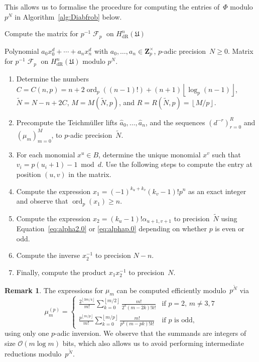 \documentclass[a4paper,11pt]{article}
\numberwithin{equation}{section}
\providecommand{\floor}[1]{\left\lfloor#1\right\rfloor}   %
\newcommand{\ZZ}{\mathbf{Z}} %
\DeclareMathOperator{\ord}{ord}          %
\DeclareMathOperator{\Frob}{\mathcal{F}} %
\providecommand{\HdR}{H_{\text{dR}}}    %
\providecommand{\BigOh}{\mathcal{O}} %
\theoremstyle{definition}
\newtheorem{rem}[thm]{Remark}
\begin{document}
This allows us to formalise the procedure for computing the 
entries of~$\Phi$ modulo~$p^N$ in Algorithm~\ref{alg:Diabfrob} 
below.

\begin{algorithm}
\caption{Compute the matrix for $p^{-1} \Frob_p$ on $\HdR^n(\mathfrak{U})$}
\label{alg:Diabfrob}
\begin{algorithmic}
\vspace{1mm}
\Require Polynomial $a_0 x_0^d + \dotsb + a_n x_n^d$ 
         with $a_0,\dotsc,a_n \in \ZZ_p^{\times}$, 
         $p$-adic precision~$N \geq 0$.
\Ensure  Matrix for $p^{-1} \Frob_p$ on $\HdR^n(\mathfrak{U})$ modulo $p^N$.
\begin{enumerate}
\item Determine the numbers 
      $C = C(n,p) = n + 2 \ord_p((n-1)!) + (n+1) \floor{\log_p(n-1)}$, 
      $\tilde{N} = N - n + 2 C$, $M = M(\tilde{N}, p)$, and 
      $R = R(\tilde{N}, p) = \floor{M/p}$.
\item Precompute the Teichm\"uller lifts $\hat{a}_0, \dotsc, \hat{a}_n$, 
      and the sequences $(d^{-r})_{r=0}^R$ and $(\mu_m)_{m=0}^{M}$, 
      to $p$-adic precision~$\tilde{N}$.
\item For each monomial $x^u \in B$, 
      determine the unique monomial $x^v$ such that 
      $v_i = p (u_i + 1) - 1 \bmod{d}$.  Use the following steps to 
      compute the entry at position $(u,v)$ in the matrix.
\item Compute the expression $x_1 = (-1)^{k_u+k_v} (k_v-1)! p^n$ as an 
      exact integer and observe that \mbox{$\ord_p(x_1) \geq n$}.
\item Compute the expression $x_2 = (k_u - 1)! \alpha_{u+1,v+1}$ to 
      precision~$\tilde{N}$ using Equation~\eqref{eq:alpha2.0} or 
      \eqref{eq:alphap.0} depending on whether $p$ is even or odd. 
\item Compute the inverse $x_2^{-1}$ to precision $N - n$.
\item Finally, compute the product $x_1 x_2^{-1}$ to precision~$N$.
\end{enumerate}
\EndProcedure
\end{algorithmic}
\end{algorithm}

\begin{rem} \label{rem:mup}
The expressions for $\mu_m$ can be computed efficiently 
modulo~$p^{\tilde{N}}$ via 
\begin{equation}
\mu_m^{(p)} = \begin{cases}
\frac{2^{\floor{3m/4}}}{m!} 
    \sum_{k=0}^{\floor{m/2}} \frac{m!}{2^k (m-2k)! k!}
    & \text{if $p = 2$, $m \neq 3, 7$} \\
\frac{p^{\floor{m/p}}}{m!} 
    \sum_{k=0}^{\floor{m/p}} \frac{m!}{p^k (m-pk)! k!}
    & \text{if $p$ is odd},
\end{cases}
\end{equation}
using only one $p$-adic inversion.  We observe that the summands are 
integers of size $\BigOh(m \log m)$ bits, which also allows us to 
avoid performing intermediate reductions modulo~$p^{\tilde{N}}$.
\end{rem}
\end{document}
